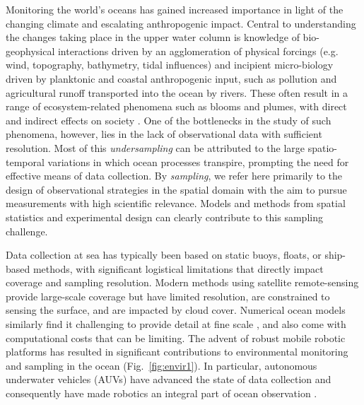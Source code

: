 \documentclass[aoas]{imsart}
\begin{document}
Monitoring the world's oceans has gained increased importance in light
of the changing climate and escalating anthropogenic impact. Central
to understanding the changes taking place in the upper water column is
knowledge of bio-geophysical interactions driven by an
agglomeration of physical forcings (e.g. wind, topography, bathymetry,
tidal influences) and incipient micro-biology driven by
planktonic and coastal anthropogenic input, such as pollution and
agricultural runoff transported into the ocean by rivers.  These often
result in a range of ecosystem-related phenomena such as blooms and
plumes, with direct and indirect effects on society \citep{ryan2017}. One of the
bottlenecks in the study of such phenomena, however, lies in the lack of
observational data with sufficient resolution. Most of this
\emph{undersampling} can be attributed to the large spatio-temporal
variations in which ocean processes transpire, prompting the need for
effective means of data collection.  By \emph{sampling}, we refer here
primarily to the design of observational strategies in the spatial
domain with the aim to pursue measurements with high scientific
relevance. Models and methods from spatial statistics and experimental design can clearly contribute to this sampling challenge.

 
Data collection at sea has typically been based on static buoys,
floats, or ship-based methods, with significant logistical limitations
that directly impact coverage and sampling resolution. Modern methods
using satellite remote-sensing provide large-scale coverage but have
limited resolution, are constrained to sensing the surface, and are
impacted by cloud cover. Numerical ocean models similarly find it
challenging to provide detail at fine scale \citep{Lermusiaux:2006},
and also come with computational costs that can be limiting. The
advent of robust mobile robotic platforms \citep{Bellingham07} has
resulted in significant contributions to environmental monitoring and
sampling in the ocean (Fig.~\ref{fig:envir1}). In particular,
autonomous underwater vehicles (AUVs) have advanced the state of data
collection and consequently have made robotics an integral part of
ocean observation \citep{das11b,Das2015,fossuminformation,fossum18b}.
\end{document}
